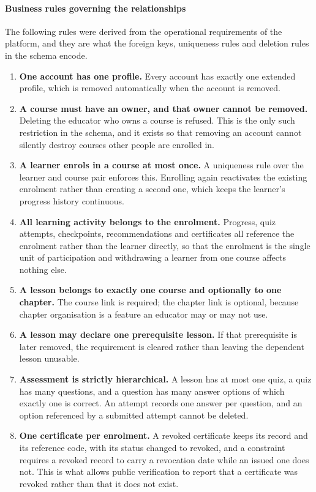 \documentclass[12pt, oneside]{article} %
\begin{document}
\paragraph{Business rules governing the relationships}

The following rules were derived from the operational requirements of the platform, and they are what the foreign keys, uniqueness rules and deletion rules in the schema encode.

\begin{enumerate}
    \item \textbf{One account has one profile.} Every account has exactly one extended profile, which is removed automatically when the account is removed.
    \item \textbf{A course must have an owner, and that owner cannot be removed.} Deleting the educator who owns a course is refused. This is the only such restriction in the schema, and it exists so that removing an account cannot silently destroy courses other people are enrolled in.
    \item \textbf{A learner enrols in a course at most once.} A uniqueness rule over the learner and course pair enforces this. Enrolling again reactivates the existing enrolment rather than creating a second one, which keeps the learner's progress history continuous.
    \item \textbf{All learning activity belongs to the enrolment.} Progress, quiz attempts, checkpoints, recommendations and certificates all reference the enrolment rather than the learner directly, so that the enrolment is the single unit of participation and withdrawing a learner from one course affects nothing else.
    \item \textbf{A lesson belongs to exactly one course and optionally to one chapter.} The course link is required; the chapter link is optional, because chapter organisation is a feature an educator may or may not use.
    \item \textbf{A lesson may declare one prerequisite lesson.} If that prerequisite is later removed, the requirement is cleared rather than leaving the dependent lesson unusable.
    \item \textbf{Assessment is strictly hierarchical.} A lesson has at most one quiz, a quiz has many questions, and a question has many answer options of which exactly one is correct. An attempt records one answer per question, and an option referenced by a submitted attempt cannot be deleted.
    \item \textbf{One certificate per enrolment.} A revoked certificate keeps its record and its reference code, with its status changed to revoked, and a constraint requires a revoked record to carry a revocation date while an issued one does not. This is what allows public verification to report that a certificate was revoked rather than that it does not exist.

\end{enumerate}
\end{document}
